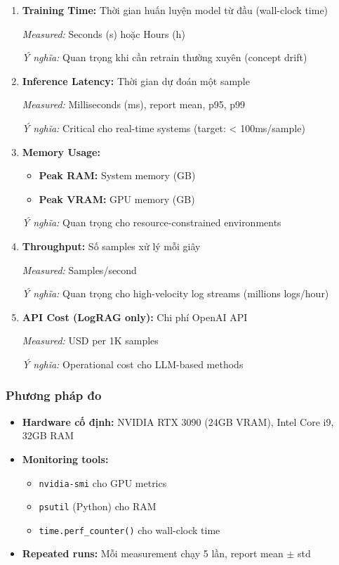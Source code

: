 \begin{enumerate}
    \item \textbf{Training Time:} Thời gian huấn luyện model từ đầu (wall-clock time)
    
    \textit{Measured:} Seconds (s) hoặc Hours (h)
    
    \textit{Ý nghĩa:} Quan trọng khi cần retrain thường xuyên (concept drift)
    
    \item \textbf{Inference Latency:} Thời gian dự đoán một sample
    
    \textit{Measured:} Milliseconds (ms), report mean, p95, p99
    
    \textit{Ý nghĩa:} Critical cho real-time systems (target: < 100ms/sample)
    
    \item \textbf{Memory Usage:}
    \begin{itemize}
        \item \textbf{Peak RAM:} System memory (GB)
        \item \textbf{Peak VRAM:} GPU memory (GB)
    \end{itemize}
    
    \textit{Ý nghĩa:} Quan trọng cho resource-constrained environments
    
    \item \textbf{Throughput:} Số samples xử lý mỗi giây
    
    \textit{Measured:} Samples/second
    
    \textit{Ý nghĩa:} Quan trọng cho high-velocity log streams (millions logs/hour)
    
    \item \textbf{API Cost (LogRAG only):} Chi phí OpenAI API
    
    \textit{Measured:} USD per 1K samples
    
    \textit{Ý nghĩa:} Operational cost cho LLM-based methods
\end{enumerate}

\subsubsection{Phương pháp đo}

\begin{itemize}
    \item \textbf{Hardware cố định:} NVIDIA RTX 3090 (24GB VRAM), Intel Core i9, 32GB RAM
    \item \textbf{Monitoring tools:} 
        \begin{itemize}
            \item \texttt{nvidia-smi} cho GPU metrics
            \item \texttt{psutil} (Python) cho RAM
            \item \texttt{time.perf\_counter()} cho wall-clock time
        \end{itemize}
    \item \textbf{Repeated runs:} Mỗi measurement chạy 5 lần, report mean $\pm$ std
\end{itemize}

